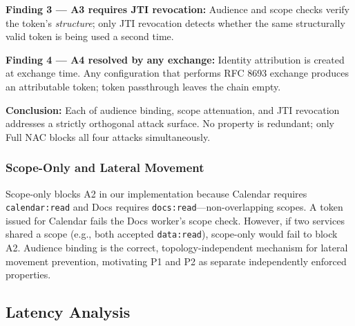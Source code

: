 \documentclass[journal]{IEEEtran}
\begin{document}
\textbf{Finding 3 — A3 requires JTI revocation:} Audience and scope checks
verify the token's \textit{structure}; only JTI revocation detects whether the
same structurally valid token is being used a second time.

\textbf{Finding 4 — A4 resolved by any exchange:} Identity attribution is
created at exchange time. Any configuration that performs RFC 8693 exchange
produces an attributable token; token passthrough leaves the chain empty.

\textbf{Conclusion:} Each of audience binding, scope attenuation, and JTI
revocation addresses a strictly orthogonal attack surface. No property is
redundant; only Full NAC blocks all four attacks simultaneously.

\subsubsection{Scope-Only and Lateral Movement}
\label{sec:scope_caveat}
Scope-only blocks A2 in our implementation because Calendar requires
\texttt{calendar:read} and Docs requires \texttt{docs:read}---non-overlapping
scopes. A token issued for Calendar fails the Docs worker's scope check.
However, if two services shared a scope (e.g., both accepted \texttt{data:read}),
scope-only would fail to block A2. Audience binding is the correct,
topology-independent mechanism for lateral movement prevention, motivating P1
and P2 as separate independently enforced properties.

\subsection{Latency Analysis}

\begin{table}[h]
\caption{End-to-end latency of \texttt{prepare\_daily\_briefing} ($N=30$)}
\label{tab:latency}
\centering
\footnotesize
\setlength{\tabcolsep}{3pt}
\end{table}
\end{document}

